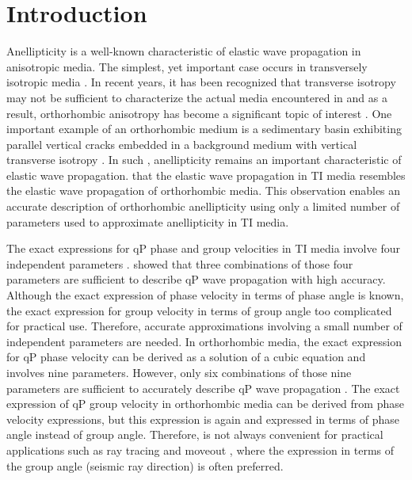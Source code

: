 \section{Introduction}

Anellipticity is a well-known characteristic of elastic wave propagation in anisotropic media. 
The simplest, yet  important case  occurs in transversely isotropic media  \cite[]{grechkabook,tsvankinbook,thomsenbook}.
In recent years, it has been recognized that transverse isotropy may not be sufficient to characterize the actual media encountered in   and as a result, orthorhombic anisotropy has become a significant topic of interest \cite[e.g.][]{tsvankinortho,tsvankinbook,bakulin2,xu,vascon,grechkabook,fowlerortho,thomsenbook}. 
One important example of an orthorhombic medium is a sedimentary basin exhibiting parallel vertical cracks embedded in a background medium 
with vertical transverse isotropy \cite[]{helbig,tsvankinortho,tsvankinbook,grechkabook}. 
In such  ,  anellipticity remains an important characteristic of elastic wave propagation.\cite{tsvankinortho,tsvankinbook}  that the elastic wave propagation in TI media resembles the elastic wave propagation  of orthorhombic media. This observation enables an accurate description of orthorhombic anellipticity using only a limited number of parameters  used to approximate anellipticity in TI media.

The exact expressions for qP phase and group velocities in TI media involve four independent parameters \cite[]{gass,berryman}. 
\cite{alkatsvankin}  showed that three combinations of those four parameters are sufficient to describe qP wave propagation with high accuracy. Although the exact expression of phase velocity in terms of phase angle is known, the exact expression for group velocity 
in terms of group angle  too complicated for practical use. Therefore, accurate approximations involving a small number of independent parameters are needed. In orthorhombic media, the exact expression for qP phase velocity can be derived as a solution of a cubic equation and involves nine parameters. However, only six combinations of those nine parameters are sufficient to accurately describe qP wave propagation \cite[]{tsvankinortho,tsvankinbook}. The exact expression of qP group velocity in orthorhombic media can be derived from phase velocity expressions, but this expression is again  and  expressed in terms of  phase angle instead of group angle. 
Therefore,  is not always convenient for practical applications such as ray tracing and moveout  , where the expression in terms of the group angle (seismic ray direction) is often preferred. 

